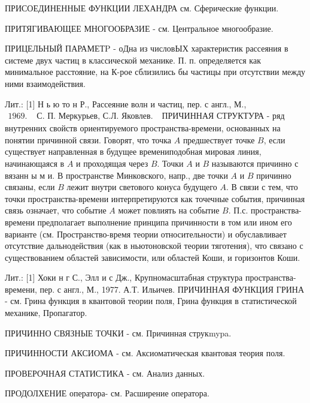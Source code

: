 \documentclass[10pt]{article}
\begin{document}
ПРИСОЕДИНЕННЫЕ ФУНКЦИИ ЛЕХАНДРА см. Сферические функции.



ПРИТЯГИВАЮЩЕЕ МНОГООБРАЗИЕ - см. Центральное многообразие.



ПРИЦЕЛЬНЫЙ ПАРАМЕТP - оДна из числовЫХ характеристик рассеяния в системе двух частиц в классической механике. П. п. определяется как минимальное расстояние, на К-рое сблизились бы частицы при отсутствии между ними взаимодействия.



Лит.: [1] Н ь ю то н Р., Рассеяние волн и частиц, пер. с англ., М., $\begin{array}{ll}1969 . & \text { С. П. Меркурьев, С.Л. Яковлев. }\end{array}$ ПРИЧИННАЯ СТРУКТУРА - ряд внутренних свойств ориентируемого пространства-времени, основанных на понятии причинной связи. Говорят, что точка $A$ предшествует точке $B$, если существует направленная в будущее времениподобная мировая линия, начинающаяся в $A$ и проходящая через $B$. Точки $A$ и $B$ называются причинно с вязанн ы м и. В пространстве Минковского, напр., две точки $A$ и $B$ причинно связаны, если $B$ лежит внутри светового конуса будущего $A$. В связи с тем, что точки пространства-времени интерпретируются как точечные события, причинная связь означает, что событие $A$ может повлиять на событие $B$. П.с. пространства-времени предполагает выполнение принципа причинности в том или ином его варианте (см. Пространство-время теории относительности) и обуславливает отсутствие дальнодействия (как в ньютоновской теории тяготения), что связано с существованием областей зависимости, или областей Коши, и горизонтов Коши.



Лит.: [1] Хоки н г С., Элл и с Дж., Крупномасштабная структура пространства-времени, пер. с англ., М., 1977. А.Т. Ильичев. ПРИЧИННАЯ ФУНКЦИЯ ГРИНА - см. Грина функция в квантовой теории поля, Грина функция в статистической механике, Пропагатор.



ПРИЧИННО СВЯЗНЫЕ ТОЧКИ - см. Причинная струкmypa.



ПРИЧИННОСТИ АКСИОМА - см. Аксиоматическая квантовая теория поля.



ПРОВЕРОЧНАЯ СТАТИСТИКА - см. Анализ данных.



ПРОДОЛХЕНИЕ оператора- см. Расширение оператора.
\end{document}
